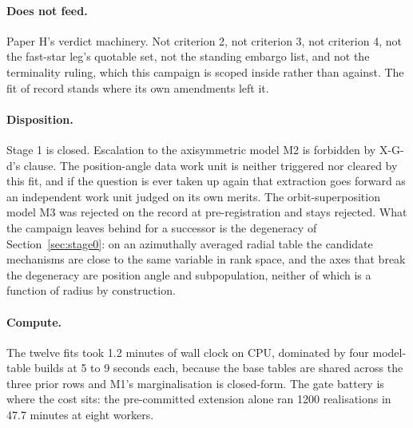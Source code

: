 \documentclass[11pt]{article}
\begin{document}
\paragraph{Does not feed.} Paper H's verdict machinery. Not criterion 2, not criterion 3, not criterion 4, not the fast-star leg's quotable set, not the standing embargo list, and not the terminality ruling, which this campaign is scoped inside rather than against. The fit of record stands where its own amendments left it.

\paragraph{Disposition.} Stage 1 is closed. Escalation to the axisymmetric model M2 is forbidden by X-G-d's clause. The position-angle data work unit is neither triggered nor cleared by this fit, and if the question is ever taken up again that extraction goes forward as an independent work unit judged on its own merits. The orbit-superposition model M3 was rejected on the record at pre-registration and stays rejected. What the campaign leaves behind for a successor is the degeneracy of Section~\ref{sec:stage0}: on an azimuthally averaged radial table the candidate mechanisms are close to the same variable in rank space, and the axes that break the degeneracy are position angle and subpopulation, neither of which is a function of radius by construction.

\paragraph{Compute.} The twelve fits took 1.2 minutes of wall clock on CPU, dominated by four model-table builds at 5 to 9 seconds each, because the base tables are shared across the three prior rows and M1's marginalisation is closed-form. The gate battery is where the cost sits: the pre-committed extension alone ran 1200 realisations in 47.7 minutes at eight workers.



\end{document}
